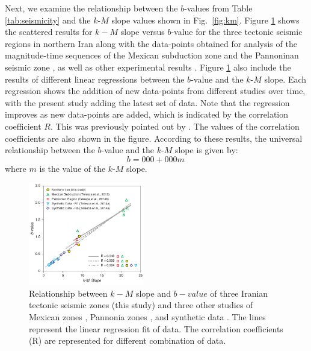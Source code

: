 Next, we examine the relationship between the $b$-values from Table \ref{tab:seismicity} and the $k$-$M$ slope values shown in Fig.~\ref{fig:km}. Figure \ref{fig:regression} shows the scattered results for $k-M$ slope versus $b$-value for the three tectonic seismic regions in northern Iran along with the data-points obtained for analysis of the magnitude-time sequences of the Mexican subduction zone \citep{Telesca2013} and the Pannoninan seismic zone \citep{Telesca2014}, as well as other experimental results \citep{Telesca2014-pone}. Figure \ref{fig:regression} also include the results of different linear regressions between the $b$-value and the $k$-$M$ slope. Each regression shows the addition of new data-points from different studies over time, with the present study adding the latest set of data. Note that the regression improves as new data-points are added, which is indicated by the correlation coefficient $R$. This was previously pointed out by \citet{Telesca2014}. The values of the correlation coefficients are also shown in the figure. According to these results, the universal relationship between the $b$-value and the $k$-$M$ slope is given by:
% 
\begin{equation}
	b = 000 + 000 m \, 
	\label{eq:universal.bm}
\end{equation}
% 
where $m$ is the value of the $k$-$M$ slope.

\begin{figure}[h]%
	\centering
	\includegraphics[width=0.45\textwidth]{figures/pdf/figure-07} 
	\caption{Relationship between $k-M$ slope and $b-value$ of three Iranian tectonic seismic zones (this study) and three other studies of Mexican zones \citep{Telesca2013}, Pannonia zones \citep{Telesca2014}, and synthetic data \citep{Telesca2014-pone}. The lines represent the linear regression fit of data. The correlation coefficients (R) are represented for different combination of data.}
	\label{fig:regression}
\end{figure}

